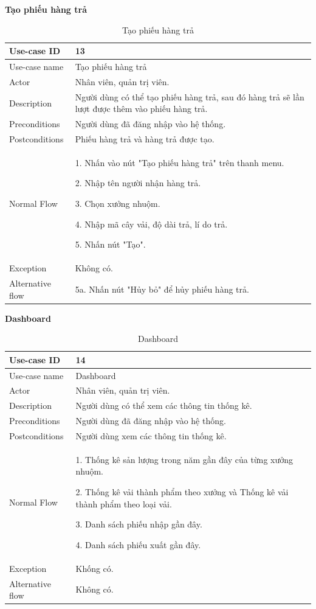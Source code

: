 \newpage
\textbf{Tạo phiếu hàng trả}
\begin{table}[!htp]
    \centering
    \begin{tabular}{|m{3cm}|m{10cm}|}
    \hline 
        Use-case ID & 13\\ \hline
        Use-case name & Tạo phiếu hàng trả\\ \hline
        Actor & Nhân viên, quản trị viên.\\ \hline
        Description & Người dùng có thể tạo phiếu hàng trả, sau đó hàng trả sẽ lần lượt được thêm vào phiếu hàng trả.\\ \hline
        Preconditions & Người dùng đã đăng nhập vào hệ thống.\\ \hline
        Postconditions & Phiếu hàng trả và hàng trả được tạo.\\ \hline
        Normal Flow & 
        1. Nhấn vào nút "Tạo phiếu hàng trả" trên thanh menu.\par 
        2. Nhập tên người nhận hàng trả.\par
        3. Chọn xưởng nhuộm.\par 
        4. Nhập mã cây vải, độ dài trả, lí do trả.\par
        5. Nhấn nút "Tạo".
        \\ \hline
        Exception & Không có.
        \\ \hline
        Alternative flow & 
        5a. Nhấn nút "Hủy bỏ" để hủy phiếu hàng trả.
        \\ 
    \hline 
    \end{tabular}
    \caption{Tạo phiếu hàng trả}
    \label{bang13}
\end{table}

\textbf{Dashboard}
\begin{table}[!htp]
    \centering
    \begin{tabular}{|m{3cm}|m{10cm}|}
    \hline 
        Use-case ID & 14\\ \hline
        Use-case name & Dashboard\\ \hline
        Actor & Nhân viên, quản trị viên.\\ \hline
        Description & Người dùng có thể xem các thông tin thống kê.\\ \hline
        Preconditions & Người dùng đã đăng nhập vào hệ thống.\\ \hline
        Postconditions & Người dùng xem các thông tin thống kê.\\ \hline
        Normal Flow & 
        1. Thống kê sản lượng trong năm gần đây của từng xưởng nhuộm.\par
        2. Thống kê vải thành phẩm theo xưởng và Thống kê vải thành phẩm theo loại vải.\par
        3. Danh sách phiếu nhập gần đây.\par
        4. Danh sách phiếu xuất gần đây.
        \\ \hline
        Exception & Khống có.\\ \hline
        Alternative flow & Không có.\\ 
    \hline 
    \end{tabular}
    \caption{Dashboard}
    \label{bang14}
\end{table}

